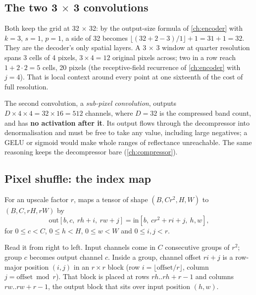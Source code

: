 \subsection{The two 3 \texorpdfstring{$\times$}{x} 3 convolutions}

Both keep the grid at 32 $\times$ 32: by the output-size formula of \cref{ch:encoder} with $k = 3$, $s =
1$, $p = 1$, a side of 32 becomes $\lfloor (32 + 2 - 3)/1 \rfloor + 1 = 31 + 1 = 32$. They are the
decoder's only spatial layers. A 3 $\times$ 3 window at quarter resolution spans 3 cells of 4 pixels,
$3 \times 4 = 12$ original pixels across; two in a row reach $1 + 2 \cdot 2 = 5$ cells, 20 pixels (the
receptive-field recurrence of \cref{ch:encoder} with $j = 4$). That is local context around every
point at one sixteenth of the cost of full resolution.

The second convolution, a \emph{sub-pixel convolution}, outputs $D \times 4 \times 4 = 32 \times 16 = 512$ channels, where $D = 32$ is the
compressed band count, and has \textbf{no activation after it}. Its output flows through the
decompressor into denormalisation and must be free to take any value, including large negatives; a
GELU or sigmoid would make whole ranges of reflectance unreachable. The same reasoning keeps the
decompressor bare (\cref{ch:compressor}).

\subsection{Pixel shuffle: the index map}

\begin{definition}
For an upscale factor $r$,  maps a tensor of shape $(B, C r^2, H, W)$ to $(B, C, rH,
rW)$ by
\begin{equation}\label{eq:decoder:shuffle}
\text{out}[b, c,\ rh + i,\ rw + j] = \text{in}[b,\ c r^2 + r i + j,\ h, w],
\end{equation}
for $0 \le c < C$, $0 \le h < H$, $0 \le w < W$ and $0 \le i, j < r$.
\end{definition}

Read it from right to left. Input channels come in $C$ consecutive groups of $r^2$; group $c$ becomes
output channel $c$. Inside a group, channel offset $ri + j$ is a row-major position $(i, j)$ in an $r
\times r$ block (row $i = \lfloor \text{offset}/r \rfloor$, column $j = \text{offset} \bmod r$). That
block is placed at rows $rh .. rh + r - 1$ and columns $rw .. rw + r - 1$, the output block that sits
over input position $(h, w)$.


